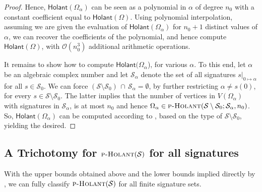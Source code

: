 \documentclass[authorcolumns,numberwithinsect]{no-lipics-v2022}
\newcommand{\zsig}[2]{\ensuremath{#1\lvert_{0\mapsto#2}}}
\newcommand{\holantprob}{\text{\sc{p-Holant}}}
\newcommand{\holant}{\mathsf{Holant}}
\begin{document}
\begin{proof}
Hence, $\holant(\Omega_{\alpha})$ can be seen as a polynomial in $\alpha$ of degree $n_0$ with a constant coefficient equal to $\holant(\Omega)$. Using polynomial interpolation, assuming we are given the evaluation of $\holant(\Omega_{\alpha})$ for $n_0+1$ distinct values of $\alpha$, we can recover the coefficients of the polynomial, and hence compute $\holant(\Omega)$, with $\mathcal{O}(n_0^3)$ additional arithmetic operations.  

It remains to show how to compute $\holant(\Omega_{\alpha}$), for various $\alpha$. To this end, let $\alpha$ be an algebraic complex number and let $\mathcal{S}_{\alpha}$ denote the set of all signatures $\zsig{s}{\alpha}$ for all $s \in \mathcal{S}_0$. We can force $(\mathcal{S}\setminus\mathcal{S}_0)\,\cap\,\mathcal{S}_{\alpha} = \emptyset$, by further restricting $\alpha \neq s(0)$, for every $s \in \mathcal{S}\setminus \mathcal{S}_0$. The latter implies that the number of vertices in $V(\Omega_{\alpha})$ with signatures in $\mathcal{S}_{\alpha}$, is at most $n_0$ and hence  $\Omega_{\alpha} \in \holantprob(\mathcal{S}\setminus\mathcal{S}_0; \mathcal{S}_{\alpha}, n_0)$. So, $\holant(\Omega_{\alpha})$ can be computed according to , based on the type of $\mathcal{S}\setminus\mathcal{S}_0$, yielding the desired.
\end{proof}

\subsection{A Trichotomy for $\holantprob(\mathcal{S})$ for all signatures}

With the upper bounds obtained above and the lower bounds implied directly by , we can fully classify $\holantprob(\mathcal{S})$ for all finite signature sets.
\end{document}
